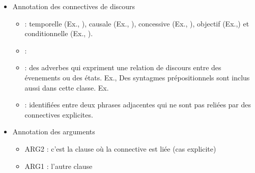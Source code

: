 \documentclass{KodeBook}
\begin{document}
\begin{itemize}
	\item Annotation des connectives de discours
	\begin{itemize}
		\item {} :  
		temporelle (Ex., ), 
		causale (Ex., ), 
		concessive (Ex., ), 
		objectif (Ex.,) et 
		conditionnelle (Ex., ).
		
		\item {} : 
		
		\item {} : des adverbes qui expriment une relation de discours entre des évenements ou des états. Ex., 
		Des syntagmes prépositionnels sont inclus aussi dans cette classe. Ex. 
		
		\item {} :  identifiées entre deux phrases adjacentes qui ne sont pas reliées par des connectives explicites.
	\end{itemize}
	\item Annotation des arguments 
	\begin{itemize}
		\item ARG2 : c'est la clause où la connective est liée (cas explicite)
		\item ARG1 : l'autre clause
	\end{itemize}
\end{itemize}
\end{document}
